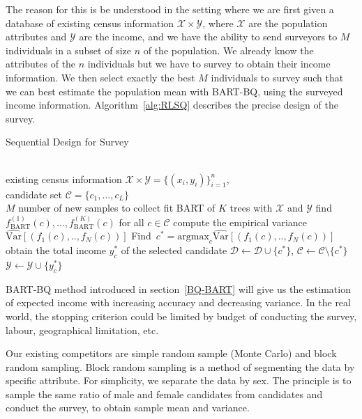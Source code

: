 The reason for this is be understood in the setting where we are first given a database of existing census information $\mathcal{X}\times\mathcal{Y}$, where $\mathcal{X}$ are the population attributes and $\mathcal{Y}$ are the income, and we have the ability to send surveyors to $M$ individuals in a subset of size $n$ of the population. We already know the attributes of the $n$ individuals but we have to survey to obtain their income information. We then select exactly the best $M$ individuals to survey such that we can best estimate the population mean with BART-BQ, using the surveyed income information. Algorithm~\ref{alg:RLSQ} describes the precise design of the survey.
\begin{algorithm}[tbh!]
  \caption{Sequential Design for Survey}
  \label{alg:RLSQ}
\begin{algorithmic}
   \\existing census information $\mathcal{X}\times\mathcal{Y} = \{(x_i, y_i)\}_{i=1}^n$,  \\candidate set $\mathcal{C} = \{c_1, \ldots, c_L\}$ \\
  $M$ number of new samples to collect
  \STATE fit BART of $K$ trees with $\mathcal{X}$ and $\mathcal{Y}$
  \STATE find $f_{\mbox{BART}}^{(1)}(c), \ldots, f_{\mbox{BART}}^{(K)}(c)$ for all $c\in\mathcal{C}$
  \STATE compute the empirical variance $\widehat{\mbox{Var}}[(f_{1}(c),..,f_{N}(c))]$
  \STATE Find $\,c^* = \mbox{argmax}_{c} \widehat{\mbox{Var}}[(f_{1}(c),..,f_{N}(c))]$
	\label{eq:maxvar}
  \STATE obtain the total income $y_c^*$ of the selected candidate
  \STATE $\mathcal{D} \leftarrow \mathcal{D}\cup \{c^*\}$, $\mathcal{C} \leftarrow \mathcal{C}\setminus \{c^*\}$
  \STATE $\mathcal{Y} \leftarrow \mathcal{Y}\cup \{y_c^*\}$
\ENDFOR
\end{algorithmic}
\end{algorithm}

BART-BQ method introduced in section~\ref{BQ-BART} will give us the estimation of expected income with increasing accuracy and decreasing variance. In the real world, the stopping criterion could be limited by budget of conducting the survey, labour, geographical limitation, etc.

Our existing competitors are simple random sample (Monte Carlo) and block random sampling. Block random sampling is a method of segmenting the data by specific attribute. For simplicity, we separate the data by sex. The principle is to sample the same ratio of male and female candidates from candidates and conduct the survey, to obtain sample mean and variance.

